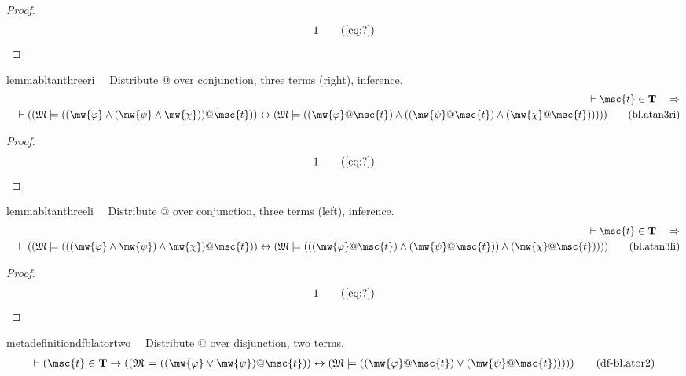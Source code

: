 \begin{proof}
\begin{align}
  1 &&  & &(\mbox{\ref{eq:?}})\notag
\end{align}
\end{proof}

\begin{restatable}{lemma}{bltanthreeri}~~ Distribute @ over conjunction, three
terms (right), inference.
\begin{align}
\vdash \msc{t} \in \mathbf{T}\quad\Rightarrow \notag \\ 
	\quad \vdash ( ( \mathfrak{M}
    \models ( ( \mw{\varphi} \wedge ( \mw{\psi} \wedge \mw{\chi} ) ) @ \msc{t}
    ) ) \leftrightarrow ( \mathfrak{M} \models ( ( \mw{\varphi} @ \msc{t} )
    \wedge ( ( \mw{\psi} @ \msc{t} ) \wedge ( \mw{\chi} @ \msc{t} ) ) ) )
    )\label{eq:bl.atan3ri}\tag{bl.atan3ri}
\end{align}
\end{restatable}

\begin{proof}
\begin{align}
  1 &&  & &(\mbox{\ref{eq:?}})\notag
\end{align}
\end{proof}

\begin{restatable}{lemma}{bltanthreeli}~~ Distribute @ over conjunction, three
terms (left), inference.
\begin{align}
\vdash \msc{t} \in \mathbf{T}\quad\Rightarrow \notag \\ 
	\quad \vdash ( ( \mathfrak{M}
    \models ( ( ( \mw{\varphi} \wedge \mw{\psi} ) \wedge \mw{\chi} ) @ \msc{t}
    ) ) \leftrightarrow ( \mathfrak{M} \models ( ( ( \mw{\varphi} @ \msc{t} )
    \wedge ( \mw{\psi} @ \msc{t} ) ) \wedge ( \mw{\chi} @ \msc{t} ) ) )
    )\label{eq:bl.atan3li}\tag{bl.atan3li}
\end{align}
\end{restatable}

\begin{proof}
\begin{align}
  1 &&  & &(\mbox{\ref{eq:?}})\notag
\end{align}
\end{proof}

\begin{restatable}{metadefinition}{dfblatortwo}~~ Distribute @ over disjunction, two
terms.
\begin{align}
\vdash ( \msc{t} \in \mathbf{T} \rightarrow ( ( \mathfrak{M} \models ( (
    \mw{\varphi} \vee \mw{\psi} ) @ \msc{t} ) ) \leftrightarrow ( \mathfrak{M}
    \models ( ( \mw{\varphi} @ \msc{t} ) \vee ( \mw{\psi} @ \msc{t} ) ) ) )
    )\label{eq:df-bl.ator2}\tag{df-bl.ator2}
\end{align}
\end{restatable}

